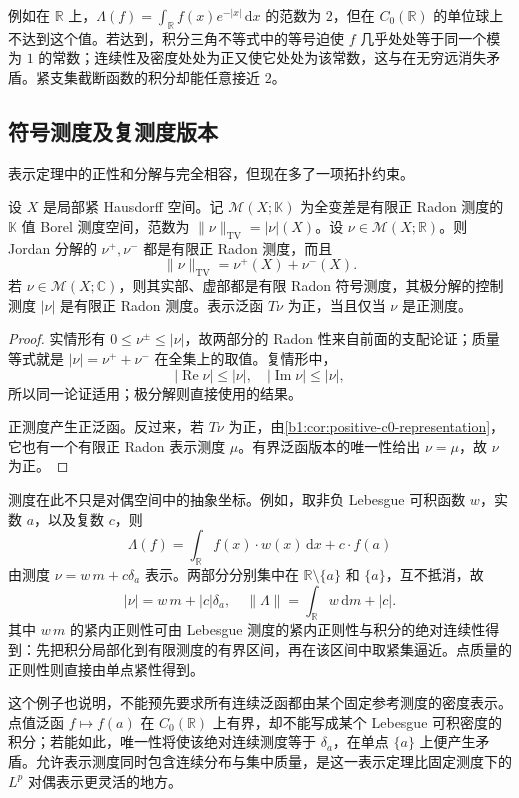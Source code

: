 \ProseParagraphBreak

例如在 \(\mathbb R\) 上，\(\Lambda(f)=\int_{\mathbb R}f(x)e^{-|x|}\,\mathrm dx\) 的范数为 \(2\)，但在 \(C_0(\mathbb R)\) 的单位球上不达到这个值。若达到，积分三角不等式中的等号迫使 \(f\) 几乎处处等于同一个模为 \(1\) 的常数；连续性及密度处处为正又使它处处为该常数，这与在无穷远消失矛盾。紧支集截断函数的积分却能任意接近 \(2\)。

\subsection{符号测度及复测度版本}
\label{b1:subsec:110404}

表示定理中的正性和分解与完全相容，但现在多了一项拓扑约束。

\begin{proposition}\label{b1:prop:radon-jordan-polar}
设 \(X\) 是局部紧 Hausdorff 空间。记 \(\mathcal M(X;\mathbb K)\) 为全变差是有限正 Radon 测度的 \(\mathbb K\) 值 Borel 测度空间，范数为 \(\|\nu\|_{\mathrm{TV}}=|\nu|(X)\)。设 \(\nu\in\mathcal M(X;\mathbb R)\)。则 Jordan 分解的 \(\nu^+,\nu^-\) 都是有限正 Radon 测度，而且
\[
 \|\nu\|_{\mathrm{TV}}=\nu^+(X)+\nu^-(X).
\]
若 \(\nu\in\mathcal M(X;\mathbb C)\)，则其实部、虚部都是有限 Radon 符号测度，其极分解的控制测度 \(|\nu|\) 是有限正 Radon 测度。表示泛函 \(T\nu\) 为正，当且仅当 \(\nu\) 是正测度。
\end{proposition}
\begin{proof}
实情形有 \(0\leq\nu^\pm\leq|\nu|\)，故两部分的 Radon 性来自前面的支配论证；质量等式就是 \(|\nu|=\nu^++\nu^-\) 在全集上的取值。复情形中，
\[
 |\operatorname{Re}\nu|\leq|\nu|,\quad
 |\operatorname{Im}\nu|\leq|\nu|,
\]
所以同一论证适用；极分解则直接使用的结果。

正测度产生正泛函。反过来，若 \(T\nu\) 为正，由\cref{b1:cor:positive-c0-representation}，它也有一个有限正 Radon 表示测度 \(\mu\)。有界泛函版本的唯一性给出 \(\nu=\mu\)，故 \(\nu\) 为正。
\end{proof}

测度在此不只是对偶空间中的抽象坐标。例如，取非负 Lebesgue 可积函数 \(w\)，实数 \(a\)，以及复数 \(c\)，则
\[
 \Lambda(f)=\int_{\mathbb R}f(x)\cdot w(x)\,\mathrm dx+c\cdot f(a)
\]
由测度 \(\nu=w\,m+c\delta_a\) 表示。两部分分别集中在 \(\mathbb R\setminus\{a\}\) 和 \(\{a\}\)，互不抵消，故
\[
 |\nu|=w\,m+|c|\delta_a,\quad
 \|\Lambda\|=\int_{\mathbb R}w\,\mathrm dm+|c|.
\]
其中 \(w\,m\) 的紧内正则性可由 Lebesgue 测度的紧内正则性与积分的绝对连续性得到：先把积分局部化到有限测度的有界区间，再在该区间中取紧集逼近。点质量的正则性则直接由单点紧性得到。

\ProseParagraphBreak

这个例子也说明，不能预先要求所有连续泛函都由某个固定参考测度的密度表示。点值泛函 \(f\mapsto f(a)\) 在 \(C_0(\mathbb R)\) 上有界，却不能写成某个 Lebesgue 可积密度的积分；若能如此，唯一性将使该绝对连续测度等于 \(\delta_a\)，在单点 \(\{a\}\) 上便产生矛盾。允许表示测度同时包含连续分布与集中质量，是这一表示定理比固定测度下的 \(L^p\) 对偶表示更灵活的地方。
